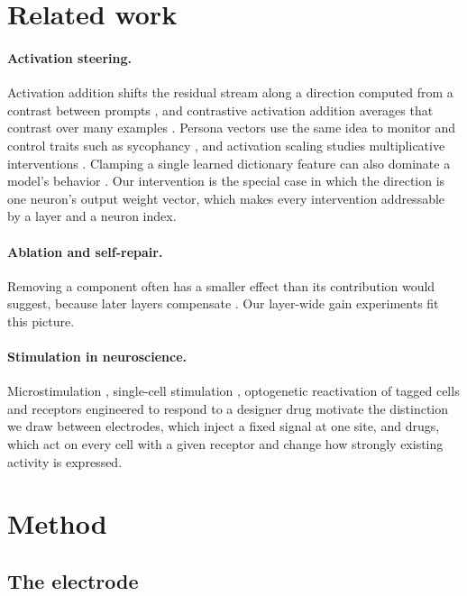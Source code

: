 \documentclass[11pt]{article}
\begin{document}
\section{Related work}

\paragraph{Activation steering.} Activation addition shifts the residual stream along a direction computed from a
contrast between prompts \citep{turner2023actadd}, and contrastive activation addition averages that contrast over
many examples \citep{rimsky2023caa}. Persona vectors use the same idea to monitor and control traits such as
sycophancy \citep{chen2025persona}, and activation scaling studies multiplicative interventions
\citep{stoehr2024scaling}. Clamping a single learned dictionary feature can also dominate a model's behavior
\citep{templeton2024scaling}. Our intervention is the special case in which the direction is one neuron's output
weight vector, which makes every intervention addressable by a layer and a neuron index.

\paragraph{Ablation and self-repair.} Removing a component often has a smaller effect than its contribution would
suggest, because later layers compensate \citep{mcgrath2023hydra}. Our layer-wide gain experiments fit this picture.

\paragraph{Stimulation in neuroscience.} Microstimulation \citep{salzman1990microstimulation}, single-cell
stimulation \citep{brecht2004whisker,houweling2008single}, optogenetic reactivation of tagged cells
\citep{liu2012engram} and receptors engineered to respond to a designer drug \citep{armbruster2007dreadd} motivate the
distinction we draw between electrodes, which inject a fixed signal at one site, and drugs, which act on every cell
with a given receptor and change how strongly existing activity is expressed.

\section{Method}

\subsection{The electrode}
\end{document}
